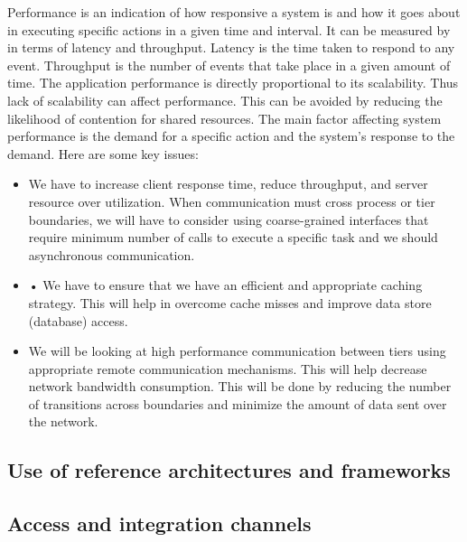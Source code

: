 \documentclass[11pt]{article}
\begin{document}
			Performance is an indication of how responsive a system is and how it goes about in executing specific actions in a given time and interval. It can be measured by in terms of latency and throughput. Latency is the time taken to respond to any event. Throughput is the number of events that take place in a given amount of time. The application performance is directly proportional to its scalability. Thus lack of scalability can affect performance. This can be avoided by reducing the likelihood of contention for shared resources. The main factor affecting system performance is the demand for a specific action and the system’s response to the demand. Here are some key issues:
			\begin{itemize}
				\item We have to increase client response time, reduce throughput, and server resource over utilization. When communication must cross process or tier boundaries, we will have to consider using coarse-grained interfaces that require minimum number of calls to execute a specific task and we should asynchronous communication.
				
				\item •	We have to ensure that we have an efficient and appropriate caching strategy. This will help in overcome cache misses and improve data store (database) access.
				
				\item We will be looking at high performance communication between tiers using appropriate remote communication mechanisms. This will help decrease network bandwidth consumption. This will be done by reducing the number of transitions across boundaries and minimize the amount of data sent over the network. 
				
			\end{itemize}	
	\subsection{Use of reference architectures and frameworks}
	
	\subsection{Access and integration channels}
	
\end{document}
